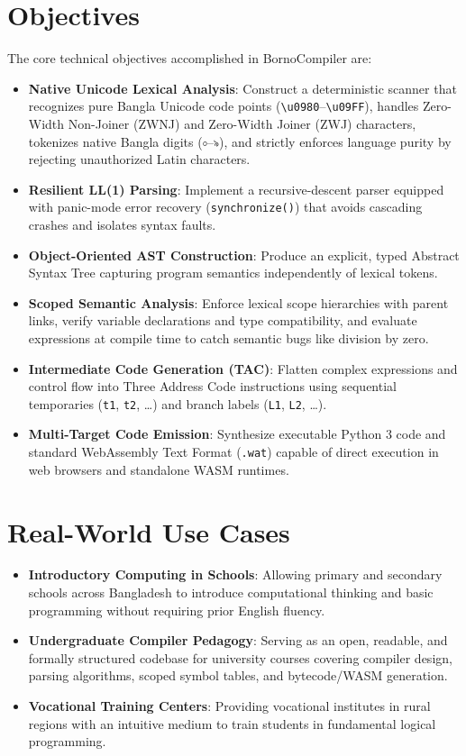 \documentclass[12pt, a4paper]{report}
\begin{document}
\section{Objectives}
The core technical objectives accomplished in BornoCompiler are:
\begin{itemize}
    \item \textbf{Native Unicode Lexical Analysis}: Construct a deterministic scanner that recognizes pure Bangla Unicode code points (\texttt{\textbackslash u0980}--\texttt{\textbackslash u09FF}), handles Zero-Width Non-Joiner (ZWNJ) and Zero-Width Joiner (ZWJ) characters, tokenizes native Bangla digits (\texttt{০}--\texttt{৯}), and strictly enforces language purity by rejecting unauthorized Latin characters.
    \item \textbf{Resilient LL(1) Parsing}: Implement a recursive-descent parser equipped with panic-mode error recovery (\texttt{synchronize()}) that avoids cascading crashes and isolates syntax faults.
    \item \textbf{Object-Oriented AST Construction}: Produce an explicit, typed Abstract Syntax Tree capturing program semantics independently of lexical tokens.
    \item \textbf{Scoped Semantic Analysis}: Enforce lexical scope hierarchies with parent links, verify variable declarations and type compatibility, and evaluate expressions at compile time to catch semantic bugs like division by zero.
    \item \textbf{Intermediate Code Generation (TAC)}: Flatten complex expressions and control flow into Three Address Code instructions using sequential temporaries (\texttt{t1}, \texttt{t2}, \dots) and branch labels (\texttt{L1}, \texttt{L2}, \dots).
    \item \textbf{Multi-Target Code Emission}: Synthesize executable Python 3 code and standard WebAssembly Text Format (\texttt{.wat}) capable of direct execution in web browsers and standalone WASM runtimes.
\end{itemize}

\section{Real-World Use Cases}
\begin{itemize}
    \item \textbf{Introductory Computing in Schools}: Allowing primary and secondary schools across Bangladesh to introduce computational thinking and basic programming without requiring prior English fluency.
    \item \textbf{Undergraduate Compiler Pedagogy}: Serving as an open, readable, and formally structured codebase for university courses covering compiler design, parsing algorithms, scoped symbol tables, and bytecode/WASM generation.
    \item \textbf{Vocational Training Centers}: Providing vocational institutes in rural regions with an intuitive medium to train students in fundamental logical programming.
\end{itemize}
\end{document}
